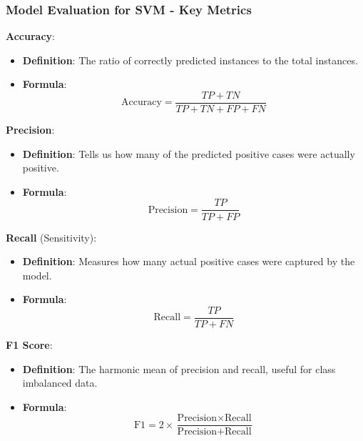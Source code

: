 \documentclass{beamer}
\begin{document}
\begin{frame}[fragile]
    \frametitle{Model Evaluation for SVM - Key Metrics}
    \textbf{Accuracy}:
    \begin{itemize}
        \item \textbf{Definition}: The ratio of correctly predicted instances to the total instances.
        \item \textbf{Formula}:  
        \[
        \text{Accuracy} = \frac{TP + TN}{TP + TN + FP + FN}
        \]
    \end{itemize}
    
    \textbf{Precision}:
    \begin{itemize}
        \item \textbf{Definition}: Tells us how many of the predicted positive cases were actually positive.
        \item \textbf{Formula}:  
        \[
        \text{Precision} = \frac{TP}{TP + FP}
        \]
    \end{itemize}
    
    \textbf{Recall} (Sensitivity):
    \begin{itemize}
        \item \textbf{Definition}: Measures how many actual positive cases were captured by the model.
        \item \textbf{Formula}:  
        \[
        \text{Recall} = \frac{TP}{TP + FN}
        \]
    \end{itemize}
    
    \textbf{F1 Score}:
    \begin{itemize}
        \item \textbf{Definition}: The harmonic mean of precision and recall, useful for class imbalanced data.
        \item \textbf{Formula}:  
        \[
        \text{F1} = 2 \times \frac{\text{Precision} \times \text{Recall}}{\text{Precision} + \text{Recall}}
        \]
    \end{itemize}
\end{frame}
\end{document}
